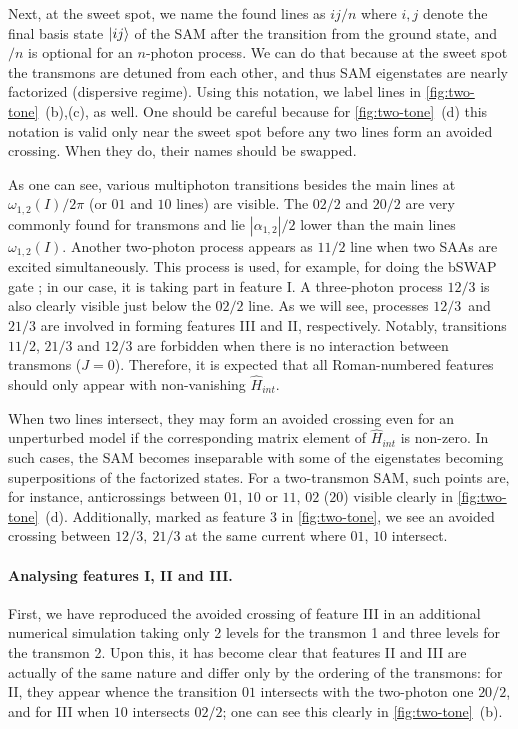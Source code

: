 \documentclass[%
 aps, prx,
 amsmath,amssymb,
 reprint,%
superscriptaddress
]{revtex4-2}
\begin{document}
Next, at the sweet spot, we name the found lines 
as $ij/n$ where $i,j$ denote the final basis 
state $\ket{ij}$ of the SAM after the transition 
from the ground state, and $/n$ is optional for 
an $n$-photon process. We can do that because at 
the sweet spot the transmons are detuned from 
each other, and thus SAM eigenstates are nearly 
factorized (dispersive regime). Using this 
notation, we label lines in 
\autoref{fig:two-tone}~(b),(c), as well. One 
should be careful because for 
\autoref{fig:two-tone}~(d) this notation is valid 
only near the sweet spot before any two lines 
form an avoided crossing. When they do, their 
names should be swapped.
 
As one can see, various multiphoton transitions besides 
the main lines at $\omega_{1,2}(I)/2\pi$ (or 
$01$ and $10$ lines) are visible. The ${02/2}$ and ${20/2}$ 
are very commonly found for transmons and lie 
$|\alpha_{1,2}|/2$ lower than the main lines 
$\omega_{1,2}(I)$. Another two-photon process 
appears as $11/2$ line when two SAAs are excited 
simultaneously. This process is used, for 
example, for doing the bSWAP 
gate \cite{poletto2012entanglement}; in our case, 
it is taking part in feature I. A 
three-photon process $12/3$ is also clearly 
visible just below the $02/2$ line. As we will 
see, processes $12/3$~and~$21/3$ are involved in forming features III and II, respectively. Notably, transitions $11/2$, ${21/3}$ and 
${12/3}$ are forbidden when there is no 
interaction between transmons ($J=0$). Therefore, 
it is expected that all Roman-numbered features 
should only appear with non-vanishing $\hat 
H_{int}$.

When two lines intersect, they may form an 
avoided crossing even for an unperturbed model if 
the corresponding matrix 
element of $\hat H_{int}$ is non-zero. In such 
cases, the SAM becomes inseparable with some of 
the eigenstates becoming superpositions of the 
factorized states. For a two-transmon SAM, such 
points are, for instance, anticrossings between 
${01}$, ${10}$ or $ {11} $, $ {02} $ ($ {20} $) 
visible clearly in \autoref{fig:two-tone}~(d). 
Additionally, marked as feature 3 in 
\autoref{fig:two-tone}, we see an avoided 
crossing between ${12}/3,\ {21}/3$ at the same 
current where ${01}$, ${10}$ intersect.


\paragraph{Analysing features I, II and III.} 
First, we have reproduced the avoided crossing of feature III in an additional numerical simulation taking only 2 levels for the transmon 1 and three levels for 
the transmon 2. Upon this, it has become clear 
that features II and III are actually of 
the same nature and differ only by the ordering 
of the transmons: for II, they appear whence the 
transition ${01}$ intersects with the two-photon 
one ${20/2}$, and for III when ${10}$ intersects ${02/2}$; 
one can see this clearly in 
\autoref{fig:two-tone}~(b).
\end{document}
